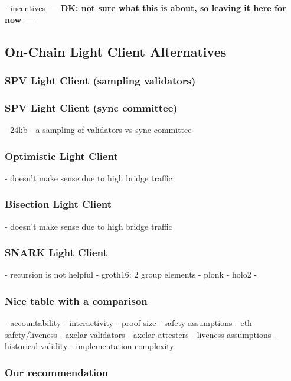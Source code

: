 - incentives \textbf{--- DK: not sure what this is about, so leaving it here for now ---}

\subsection{On-Chain Light Client Alternatives}\label{subsec:alternatives}

\subsubsection{SPV Light Client (sampling validators)}
\subsubsection{SPV Light Client (sync committee)} 
        - 24kb 
        - a sampling of validators vs sync committee
\subsubsection{Optimistic Light Client}
        - doesn't make sense due to high bridge traffic
\subsubsection{Bisection Light Client}
        - doesn't make sense due to high bridge traffic
\subsubsection{SNARK Light Client}
        - recursion is not helpful
        - groth16: 2 group elements
        - plonk
        - holo2
        -
\subsubsection{Nice table with a comparison}
         - accountability
         - interactivity
         - proof size 
         - safety assumptions
             - eth safety/liveness
             - axelar validators 
             - axelar attesters 
         - liveness assumptions
         - historical validity
         - implementation complexity
\subsubsection{Our recommendation}

